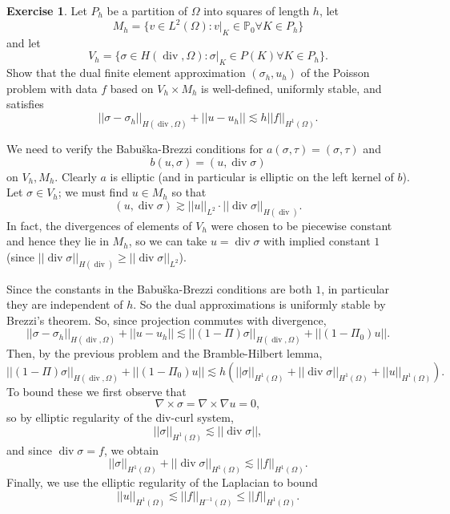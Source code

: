 \documentclass[10pt]{article}
\DeclareMathOperator{\Div}{div}
\theoremstyle{definition}
\newtheorem{exer}{Exercise}
\begin{document}
\begin{exer}
    Let $P_h$ be a partition of $\Omega$ into squares of length $h$, let
    $$M_h = \{v \in L^2(\Omega): v|_K \in \mathbb P_0 \forall K \in P_h\}$$
    and let 
    $$V_h = \{\sigma \in H(\Div, \Omega): \sigma|_K \in P(K) \forall K \in P_h\}.$$
    Show that the dual finite element approximation $(\sigma_h, u_h)$ of the Poisson problem with data $f$ based on $V_h \times M_h$ is well-defined, uniformly stable, and satisfies 
    $$||\sigma - \sigma_h||_{H(\Div, \Omega)} + ||u - u_h|| \lesssim h ||f||_{H^1(\Omega)}.$$
\end{exer}

    We need to verify the Babuška-Brezzi conditions for $a(\sigma, \tau) = (\sigma, \tau)$ and 
    $$b(u, \sigma) = (u, \Div \sigma)$$
    on $V_h, M_h$. Clearly $a$ is elliptic (and in particular is elliptic on the left kernel of $b$).
    Let $\sigma \in V_h$; we must find $u \in M_h$ so that 
    $$(u, \Div \sigma) \gtrsim ||u||_{L^2} \cdot ||\Div \sigma||_{H(\Div)}.$$
    In fact, the divergences of elements of $V_h$ were chosen to be piecewise constant and hence they lie in $M_h$, so we can take $u = \Div \sigma$ with implied constant $1$ (since $||\Div \sigma||_{H(\Div)} \geq ||\Div \sigma||_{L^2}$).
    
    Since the constants in the Babuška-Brezzi conditions are both $1$, in particular they are independent of $h$.
    So the dual approximations is uniformly stable by Brezzi's theorem. So, since projection commutes with divergence,
    $$||\sigma - \sigma_h||_{H(\Div, \Omega)} + ||u - u_h|| \lesssim ||(1 - \Pi) \sigma||_{H(\Div, \Omega)} + ||(1 - \Pi_0) u||.$$
    Then, by the previous problem and the Bramble-Hilbert lemma,
    $$||(1 - \Pi) \sigma||_{H(\Div, \Omega)} + ||(1 - \Pi_0) u|| \lesssim h\left(||\sigma||_{H^1(\Omega)} + ||\Div \sigma||_{H^1(\Omega)} + ||u||_{H^1(\Omega)}\right).$$
    To bound these we first observe that
    $$\nabla \times \sigma = \nabla \times \nabla u = 0,$$
    so by elliptic regularity of the div-curl system,
    $$||\sigma||_{H^1(\Omega)} \lesssim ||\Div \sigma||,$$
    and since $\Div \sigma = f$, we obtain 
    $$||\sigma||_{H^1(\Omega)} + ||\Div \sigma||_{H^1(\Omega)} \lesssim ||f||_{H^1(\Omega)}.$$
    Finally, we use the elliptic regularity of the Laplacian to bound 
    $$||u||_{H^1(\Omega)} \lesssim ||f||_{H^{-1}(\Omega)} \leq ||f||_{H^1(\Omega)}.$$
\end{document}
